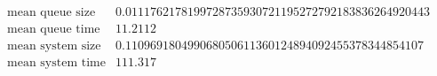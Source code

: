 \[\begin{array}{cc}
 \text{mean queue size} & 0.0111762178199728735930721195272792183836264920443 \\
 \text{mean queue time} & 11.2112 \\
 \text{mean system size} & 0.110969180499068050611360124894092455378344854107 \\
 \text{mean system time} & 111.317 \\
\end{array}\]

